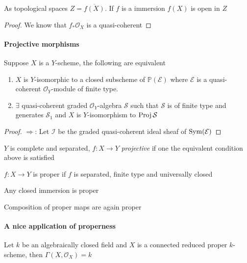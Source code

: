 \documentclass[main]{subfiles}
\begin{document}
\clubsuit\quad As topological spaces $Z=\overline{f(X)}$. If $f$ is a immersion $f(X)$ is open in $Z$
\begin{proof}
We know that $f_*\mathcal O_X$ is a quasi-coherent
\end{proof}

\paragraph{Projective morphisms} Suppose $X$ is a $Y$-scheme, the following are equivalent
\begin{enumerate}
\item $X$ is $Y$-isomorphic to a closed subscheme of $\mathbb P(\mathcal E)$ where $\mathcal E$ is a quasi-coherent $\mathcal O_Y$-module of finite type.
\item $\exists$ quasi-coherent graded $\mathcal O_Y$-algebra $\mathcal S$ such that $\mathcal S$ is of finite type and generates $\mathcal S_1$ and $X$ is $Y$-isomorphism to $\operatorname{Proj}\mathcal S$
\end{enumerate}

\begin{proof}
$\Rightarrow$: Let $\mathcal I$ be the graded quasi-coherent ideal sheaf of $\operatorname{Sym}(\mathcal E)$
\end{proof}

\begin{definition}
$Y$ is complete and separated, $f:X\to Y$ \textit{projective} if one the equivalent condition above is satisfied
\end{definition}

\begin{definition}
$f:X\to Y$ is proper if $f$ is separated, finite type and universally closed
\end{definition}

\clubsuit\quad Any closed immersion is proper

\clubsuit\quad Composition of proper maps are again proper

\paragraph{A nice application of properness} Let $k$ be an algebraically closed field and $X$ is a connected reduced proper $k$-scheme, then $\Gamma(X,\mathcal O_X)=k$
\end{document}
